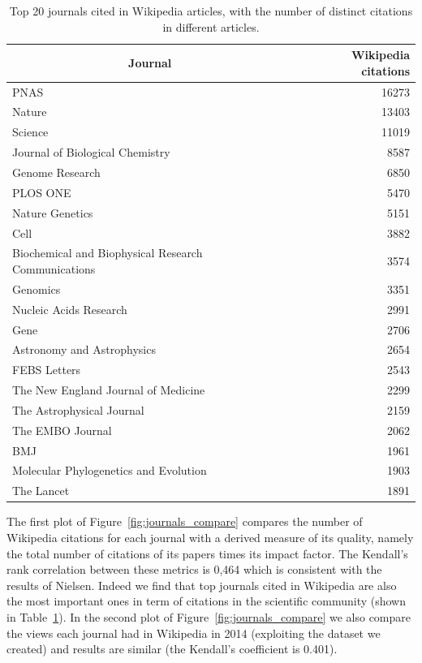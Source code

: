 \begin{table}[t]
\centering
\begin{tabular}{@{}lr@{}}
\toprule
\multicolumn{1}{c}{\textbf{Journal}} & \textbf{Wikipedia citations} \\ \midrule
PNAS  &  16273 \\
Nature  &  13403 \\
Science  &  11019 \\
Journal of Biological Chemistry  &  8587 \\
Genome Research  &  6850 \\
PLOS ONE  &  5470 \\
Nature Genetics  &  5151 \\
Cell  &  3882 \\
Biochemical and Biophysical Research Communications  &  3574 \\
Genomics  &  3351 \\
Nucleic Acids Research  &  2991 \\
Gene  &  2706 \\
Astronomy and Astrophysics  &  2654 \\
FEBS Letters  &  2543 \\
The New England Journal of Medicine  &  2299 \\
The Astrophysical Journal  &  2159 \\
The EMBO Journal  &  2062 \\
BMJ  &  1961 \\
Molecular Phylogenetics and Evolution  &  1903 \\
The Lancet  &  1891 \\
\bottomrule
\end{tabular}
\caption{Top 20 journals cited in Wikipedia articles, with the number of distinct citations in different articles.}
\label{tbl:top20_cited_wikipedia_journals}
\end{table}

The first plot of Figure~\ref{fig:journals_compare} compares the number of Wikipedia citations for each journal with a derived measure of its quality, namely the total number of citations of its papers times its impact factor.
The Kendall's rank correlation between these metrics is 0,464 which is consistent with the results of Nielsen.
Indeed we find that top journals cited in Wikipedia are also the most important ones in term of citations in the scientific community (shown in Table~\ref{tbl:top20_cited_wikipedia_journals}).
In the second plot of Figure~\ref{fig:journals_compare} we also compare the views each journal had in Wikipedia in 2014 (exploiting the dataset we created) and results are similar (the Kendall's coefficient is 0.401).

